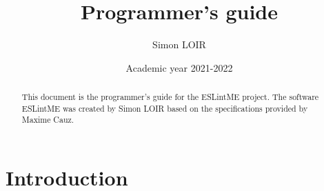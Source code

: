 \documentclass[12pt]{article}
\title{Programmer's guide}
\author{Simon LOIR}
\date{Academic year 2021-2022}
\begin{document}
\begin{titlepage}
\maketitle
\begin{abstract}
\noindent    
This document is the programmer's guide for the ESLintME project. 
The software ESLintME was created by Simon LOIR based on the specifications provided by Maxime Cauz.
\end{abstract}
\end{titlepage}

\section{Introduction}




\end{document}
